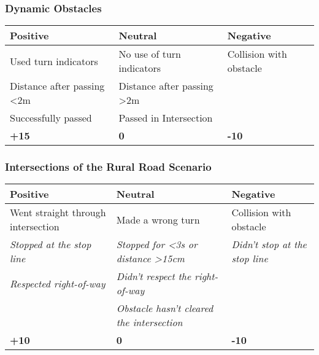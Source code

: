 {\subsubsection*{Dynamic Obstacles}
\begin{table}[H]
    \begin{tabularx}{\textwidth}{@{}XXX@{}}
        \toprule
        \textbf{Positive}          & \textbf{Neutral}           & \textbf{Negative}       \\
        \midrule
        Used turn indicators       & No use of turn indicators  & Collision with obstacle \\
        Distance after passing <2m & Distance after passing >2m &                         \\
        Successfully passed        & Passed in Intersection     &                         \\
        \textbf{+15}               & \textbf{0}                 & \textbf{-10}            \\
        \bottomrule
    \end{tabularx}
\end{table}

\subsubsection*{Intersections of the Rural Road Scenario}
\begin{table}[H]
    \begin{tabularx}{\textwidth}{@{}XXX@{}}
        \toprule
        \textbf{Positive}                                 & \textbf{Neutral}                                                  & \textbf{Negative}                                     \\
        \midrule
        Went straight through intersection                & Made a wrong turn                                                 & Collision with obstacle                               \\
        \textit{Stopped at the stop line}\footnotemark[1] & \textit{Stopped for <3s or distance >15cm}\footnotemark[1]        & \textit{Didn't stop at the stop line}\footnotemark[1] \\
        \textit{Respected right-of-way}\footnotemark[2]   & \textit{Didn't respect the right-of-way}\footnotemark[2]          &                                                       \\
                                                          & \textit{Obstacle hasn't cleared the intersection}\footnotemark[2] &                                                       \\
        \textbf{+10}                                      & \textbf{0}                                                        & \textbf{-10}                                          \\
        \bottomrule
    \end{tabularx}
\end{table}

}

